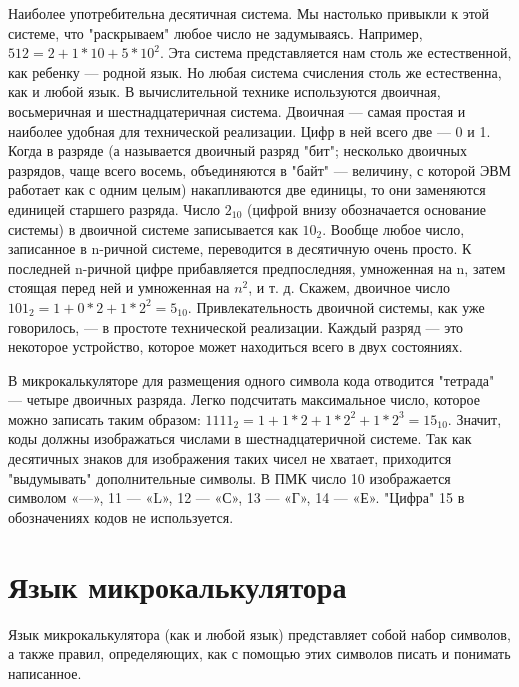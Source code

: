 \documentclass[11pt,a4paper,oneside]{article}
\begin{document}
Наиболее употребительна десятичная система. Мы настолько привыкли к этой системе, что "раскрываем" любое число не задумываясь. Например, $512 = 2 + 1 * 10 + 5*10^{2}$. Эта система представляется нам столь же естественной, как ребенку — родной язык. Но любая система счисления столь же естественна, как и любой язык. В вычислительной технике используются двоичная, восьмеричная и шестнадцатеричная система. Двоичная — самая простая и наиболее удобная для технической реализации. Цифр в ней всего две — 0 и 1. Когда в разряде (а называется двоичный разряд "бит"; несколько двоичных разрядов, чаще всего восемь, объединяются в "байт" — величину, с которой ЭВМ работает как с одним целым) накапливаются две единицы, то они заменяются единицей старшего разряда. Число $2_{10}$ (цифрой внизу обозначается основание системы) в двоичной системе записывается как $10_{2}$. Вообще любое число, записанное в n-ричной системе, переводится в десятичную очень просто. К последней n-ричной цифре прибавляется предпоследняя, умноженная на n, затем стоящая перед ней и умноженная на $n^{2}$, и т. д. Скажем, двоичное число $101_{2} = 1+0*2 + 1*2^{2} = 5_{10}$. Привлекательность двоичной системы, как уже говорилось, — в простоте технической реализации. Каждый разряд — это некоторое устройство, которое может находиться всего в двух состояниях.

В микрокалькуляторе для размещения одного символа кода отводится "тетрада" — четыре двоичных разряда. Легко подсчитать максимальное число, которое можно записать таким образом: $1111_{2} = 1 + 1 * 2 + 1 * 2^{2} + 1 * 2^{3} = 15_{10}$. Значит, коды должны изображаться числами в шестнадцатеричной системе. Так как десятичных знаков для изображения таких чисел не хватает, приходится "выдумывать" дополнительные символы. В ПМК число 10 изображается символом «—», 11 — «L», 12 — «С», 13 — «Г», 14 — «Е». "Цифра" 15 в обозначениях кодов не используется.

\section{Язык микрокалькулятора}
Язык микрокалькулятора (как и любой язык) представляет собой набор символов, а также правил, определяющих, как с помощью этих символов писать и понимать написанное.
\end{document}
